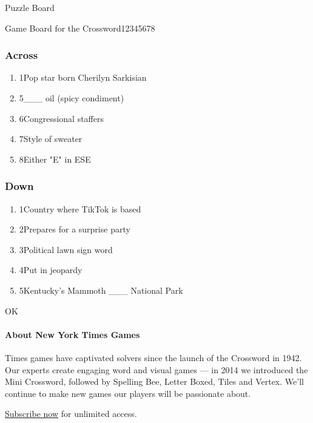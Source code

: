 Puzzle Board

Game Board for the Crossword12345678

\hypertarget{across}{%
\subsubsection{Across}\label{across}}

\begin{enumerate}
\def\labelenumi{\arabic{enumi}.}
\tightlist
\item
  1Pop star born Cherilyn Sarkisian
\item
  5\_\_\_ oil (spicy condiment)
\item
  6Congressional staffers
\item
  7Style of sweater
\item
  8Either "E" in ESE
\end{enumerate}

\hypertarget{down}{%
\subsubsection{Down}\label{down}}

\begin{enumerate}
\def\labelenumi{\arabic{enumi}.}
\tightlist
\item
  1Country where TikTok is based
\item
  2Prepares for a surprise party
\item
  3Political lawn sign word
\item
  4Put in jeopardy
\item
  5Kentucky's Mammoth \_\_\_ National Park
\end{enumerate}

OK

\hypertarget{about-new-york-times-games}{%
\paragraph{About New York Times
Games}\label{about-new-york-times-games}}

Times games have captivated solvers since the launch of the Crossword in
1942. Our experts create engaging word and visual games --- in 2014 we
introduced the Mini Crossword, followed by Spelling Bee, Letter Boxed,
Tiles and Vertex. We'll continue to make new games our players will be
passionate about.

\href{https://www.nytimes.com/subscription/games?campaignId=9W9LL}{Subscribe
now} for unlimited access.

